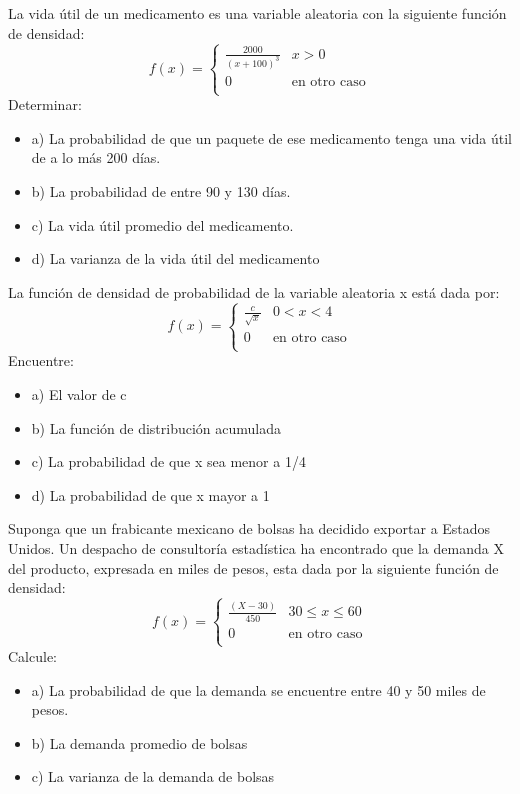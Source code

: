 \documentclass{oxmathproblems}
\begin{document}
\begin{questions}

\miquestion La vida útil de un medicamento es una variable aleatoria con la siguiente función de densidad: 
\[   
f(x) = 
     \begin{cases}
       \frac{2000}{(x+100)^3} & x > 0 \\
       0 & \text{en otro caso} \\
     \end{cases}
\]
$$$$
Determinar: 
\begin{itemize}
\item  a) La probabilidad de que un paquete de ese medicamento tenga una vida útil de a lo más 200 días. 
\item  b) La probabilidad de entre 90 y 130 días.
\item  c) La vida útil promedio del medicamento. 
\item  d) La varianza de la vida útil del medicamento
\end{itemize}

\miquestion La función de densidad de probabilidad de la variable aleatoria x está dada por: 
\[ 
f(x) = 
     \begin{cases}
       \frac{c}{\sqrt{x}} & 0 <x < 4 \\
       0 & \text{en otro caso} \\
     \end{cases}
\]
$$$$
Encuentre:  
\begin{itemize}
\item  a) El valor de c
\item  b) La función de distribución acumulada 
\item  c) La probabilidad de que x sea menor a 1/4 
\item  d) La probabilidad de que x mayor a 1
\end{itemize}

\miquestion Suponga que un frabicante mexicano de bolsas ha decidido exportar a Estados Unidos. Un despacho de consultoría estadística ha encontrado que la demanda X del producto, expresada en miles de pesos, esta dada por la siguiente función de densidad: 
\[ 
f(x) = 
     \begin{cases}
       \frac{(X-30)}{450}  & 30  \leq x  \leq 60 \\
       0 & \text{en otro caso} \\
     \end{cases}
\]
$$$$
Calcule: 
\begin{itemize}
\item  a) La probabilidad de que la demanda se encuentre entre 40 y 50 miles de pesos. 
\item  b) La demanda promedio de bolsas 
\item  c) La varianza de la demanda de bolsas
\end{itemize}


\end{questions}
\end{document}
